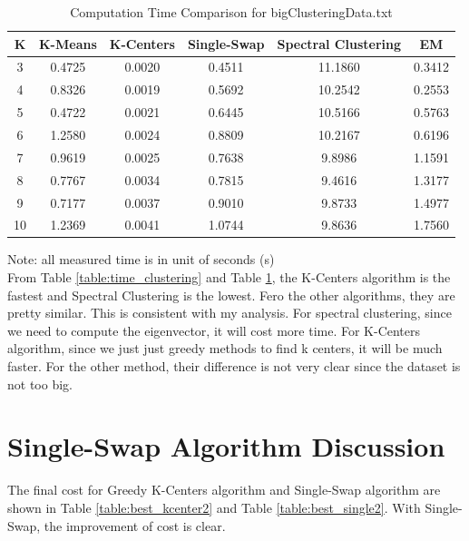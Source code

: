 \begin{table}[H]
	\centering
	\caption{Computation Time Comparison for bigClusteringData.txt}
	\label{table:time_bigClustering}	
	\begin{tabular}{ c | c | c | c | c | c }
		\hline \hline
		K  	&	K-Means     & K-Centers    & Single-Swap    & Spectral Clustering    & EM \\[0.1cm]
		\hline
		3	   &	0.4725     & 0.0020   & 0.4511    & 11.1860    & 0.3412 \\[0.1cm]
		4    &	0.8326     & 0.0019   & 0.5692    & 10.2542    & 0.2553 \\[0.1cm]
		5    &	0.4722     & 0.0021   & 0.6445    & 10.5166    & 0.5763 \\[0.1cm]
		6    &	1.2580     & 0.0024   & 0.8809    & 10.2167    & 0.6196 \\[0.1cm]
		7    &	0.9619     & 0.0025   & 0.7638    & 9.8986      & 1.1591 \\[0.1cm]
		8    &	0.7767     & 0.0034   & 0.7815    & 9.4616      & 1.3177 \\[0.1cm]
		9    &	0.7177     & 0.0037   & 0.9010    & 9.8733      & 1.4977 \\[0.1cm]
		10    &	1.2369     & 0.0041   & 1.0744    & 9.8636      & 1.7560 \\[0.1cm]
		\hline	
	\end{tabular}
\end{table}
{\centering Note: all measured time is in unit of seconds (s)}\\


From Table \ref{table:time_clustering} and Table \ref{table:time_bigClustering}, the K-Centers algorithm is the fastest and Spectral Clustering is the lowest. Fero the other algorithms, they are pretty similar. This is consistent with my analysis. For spectral clustering, since we need to compute the eigenvector, it will cost more time. For K-Centers algorithm, since we just just greedy methods to find k centers, it will be much faster. For the other method, their difference is not very clear since the dataset is not too big.

\section{\Large Single-Swap Algorithm Discussion}

The final cost for Greedy K-Centers algorithm and Single-Swap algorithm are shown in Table \ref{table:best_kcenter2} and Table \ref{table:best_single2}. With Single-Swap, the improvement of cost is clear.

